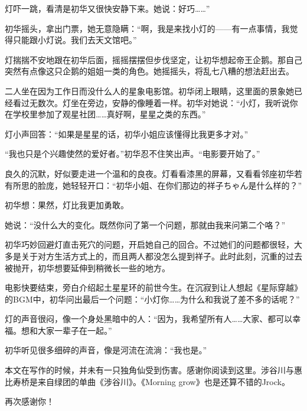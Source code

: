\documentclass{article}
\begin{document}
灯吓一跳，看清是初华又很快安静下来。她说：好巧……”



初华摇头，拿出门票，她无意隐瞒：“啊，我是来找小灯的——有一点事情，我觉得只能跟小灯说。我们去天文馆吧。”



灯揣揣不安地跟在初华后面，摇摇摆摆但步伐坚定，让初华想起帝王企鹅。那自己突然有点像这只企鹅的姐姐一类的角色。她摇摇头，将乱七八糟的想法赶出去。



二人坐在因为工作日而没什么人的星象电影馆。初华闭上眼睛，这里面的景象她已经看过无数次。灯坐在旁边，安静的像睡着一样。初华对她说：“小灯，我听说你在学校里参加了观星社团……真好啊，星星之类的东西。”



灯小声回答：“如果是星星的话，初华小姐应该懂得比我更多才对。”



“我也只是个兴趣使然的爱好者。”初华忍不住笑出声。“电影要开始了。”



良久的沉默，好似要走进一个温和的良夜。灯看看漆黑的屏幕，又看看邻座初华若有所思的脸庞，她轻轻开口：“初华小姐、在你们那边的祥子ちゃん是什么样的？”



初华想：果然，灯比我更加勇敢。



她说：“没什么大的变化。既然你问了第一个问题，那就由我来问第二个咯？”



初华巧妙回避灯直击死穴的问题，开启她自己的回合。不过她们的问题都很轻，大多是关于对方生活方式上的，而且两人都没怎么提到祥子。此时此刻，沉重的过去被抛开，初华想要延伸到稍微长一些的地方。



电影快要结束，旁白介绍起土星星环的前世今生。在沉寂到让人想起《星际穿越》的BGM中，初华问出最后一个问题：“小灯你……为什么和我说了差不多的话呢？”



灯的声音很闷，像一个身处黑暗中的人：“因为，我希望所有人……大家、都可以幸福。想和大家一辈子在一起。”



初华听见很多细碎的声音，像是河流在流淌：“我也是。”



\newpage



本文在写作的时候，并未有一只独角仙受到伤害。感谢你阅读到这里。涉谷川与惠比寿桥是来自绿团的单曲《涉谷川》。《Morning grow》也是还算不错的Jrock。

再次感谢你！
\end{document}
